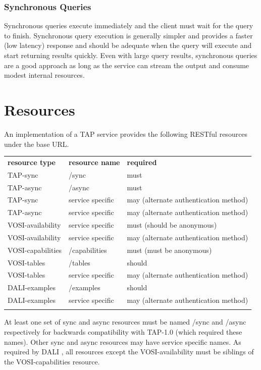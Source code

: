 \documentclass[11pt,letter]{ivoa}
\begin{document}
\subsubsection{Synchronous Queries}
Synchronous queries execute immediately  and the client must wait for the query 
to finish. Synchronous query execution is generally simpler and provides a 
faster (low latency) response and should be adequate when the query will execute 
and start returning results quickly. Even with large query results, synchronous 
queries are a good approach as long as the service can stream the output 
and consume modest internal resources. 

\section{Resources}
\label{sec:resources}

An implementation of a TAP service provides the following RESTful resources 
under the base URL.

\medskip
\begin{inlinetable}
\begin{tabular}{l l l}
\sptablerule
\textbf{resource type} & \textbf{resource name} & \textbf{required} \\
\sptablerule
TAP-sync & /sync & must \\
TAP-async & /async & must \\
TAP-sync & service specific & may (alternate authentication method) \\
TAP-async & service specific & may (alternate authentication method) \\
VOSI-availability & service specific & must (should be anonymous) \\
VOSI-availability & service specific & may (alternate authentication method) \\
VOSI-capabilities & /capabilities & must (must be anonymous) \\
VOSI-tables & /tables & should \\
VOSI-tables & service specific & may (alternate authentication method) \\
DALI-examples & /examples & should \\
DALI-examples & service specific & may (alternate authentication method) \\
\sptablerule
\end{tabular}
\end{inlinetable}
\medskip

At least one set of {sync} and {async} resources must be named /sync and 
/async respectively for backwards compatibility with TAP-1.0 (which required 
these names). Other  {sync} and {async} resources may have service specific names. 
As required by DALI \citep{2017ivoa.spec.0517D}, all resources except the VOSI-availability must 
be siblings of the VOSI-capabilities resource. 
\end{document}

